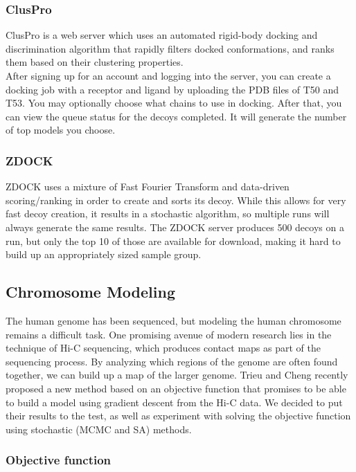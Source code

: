 \documentclass{article}
\begin{document}
\subsubsection*{ClusPro}

ClusPro is a web server which uses an automated rigid-body docking and discrimination algorithm that rapidly filters docked conformations, and ranks them based on their clustering properties.\\

After signing up for an account and logging into the server, you can create a docking job with a receptor and ligand by uploading the PDB files of T50 and T53. You may optionally choose what chains to use in docking. After that, you can view the queue status for the decoys completed. It will generate the number of top models you choose.


\subsubsection*{ZDOCK}

ZDOCK uses a mixture of Fast Fourier Transform and data-driven scoring/ranking in order to create and sorts its decoy. While this allows for very fast decoy creation, it results in a stochastic algorithm, so multiple runs will always generate the same results. The ZDOCK server produces 500 decoys on a run, but only the top 10 of those are available for download, making it hard to build up an appropriately sized sample group.


\subsection{Chromosome Modeling}

The human genome has been sequenced, but modeling the human chromosome remains a difficult task.  One promising avenue of modern research lies in the technique of Hi-C sequencing, which produces contact maps as part of the sequencing process.  By analyzing which regions of the genome are often found together, we can build up a map of the larger genome.  Trieu and Cheng recently proposed a new method based on an objective function that promises to be able to build a model using gradient descent from the Hi-C data.  We decided to put their results to the test, as well as experiment with solving the objective function using stochastic (MCMC and SA) methods.

\subsubsection{Objective function}
\end{document}
